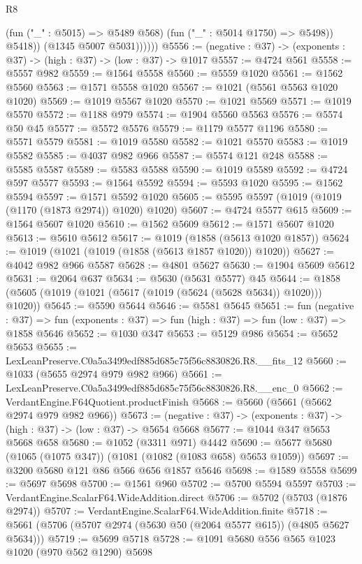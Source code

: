 \begin{lexlean}{R8}
\begin{coremodule}
                    (fun ("_" : @5015) => @5489 @568)
                    (fun ("_" : @5014 @1750) => @5498))
                  @5418))
              (@1345 @5007 @5031))))))
@5556 := (negative : @37) -> (exponents : @37) -> (high : @37) -> (low : @37) -> @1017
@5557 := @4724 @561
@5558 := @5557 @982
@5559 := @1564 @5558
@5560 := @5559 @1020
@5561 := @1562 @5560
@5563 := @1571 @5558 @1020
@5567 := @1021 (@5561 @5563 @1020 @1020)
@5569 := @1019 @5567 @1020
@5570 := @1021 @5569
@5571 := @1019 @5570
@5572 := @1188 @979
@5574 := @1904 @5560 @5563
@5576 := @5574 @50 @45
@5577 := @5572 @5576
@5579 := @1179 @5577 @1196
@5580 := @5571 @5579
@5581 := @1019 @5580
@5582 := @1021 @5570
@5583 := @1019 @5582
@5585 := @4037 @982 @966
@5587 := @5574 @121 @248
@5588 := @5585 @5587
@5589 := @5583 @5588
@5590 := @1019 @5589
@5592 := @4724 @597 @5577
@5593 := @1564 @5592
@5594 := @5593 @1020
@5595 := @1562 @5594
@5597 := @1571 @5592 @1020
@5605 := @5595 @5597 (@1019 (@1019 (@1170 (@1873 @2974)) @1020) @1020)
@5607 := @4724 @5577 @615
@5609 := @1564 @5607 @1020
@5610 := @1562 @5609
@5612 := @1571 @5607 @1020
@5613 := @5610 @5612
@5617 := @1019 (@1858 (@5613 @1020 @1857))
@5624 := @1019 (@1021 (@1019 (@1858 (@5613 @1857 @1020)) @1020))
@5627 := @4042 @982 @966 @5587
@5628 := @4801 @5627
@5630 := @1904 @5609 @5612
@5631 := @2064 @637
@5634 := @5630 (@5631 @5577) @45
@5644 := @1858 (@5605 (@1019 (@1021 (@5617 (@1019 (@5624 (@5628 @5634)) @1020))) @1020))
@5645 := @5590 @5644
@5646 := @5581 @5645
@5651 := fun (negative : @37) =>
  fun (exponents : @37) => fun (high : @37) => fun (low : @37) => @1858 @5646
@5652 := @1030 @347
@5653 := @5129 @986
@5654 := @5652 @5653
@5655 := LexLeanPreserve.C0a5a3499edf885d685c75f56c8830826.R8.__fits_12
@5660 := @1033 (@5655 @2974 @979 @982 @966)
@5661 := LexLeanPreserve.C0a5a3499edf885d685c75f56c8830826.R8.__enc_0
@5662 := VerdantEngine.F64Quotient.productFinish
@5668 := @5660 (@5661 (@5662 @2974 @979 @982 @966))
@5673 := (negative : @37) -> (exponents : @37) -> (high : @37) -> (low : @37) -> @5654 @5668
@5677 := @1044 @347 @5653 @5668 @658
@5680 := @1052 (@3311 @971) @4442
@5690 := @5677 @5680 (@1065 (@1075 @347)) (@1081 (@1082 (@1083 @658) @5653 @1059))
@5697 := @3200 @5680 @121 @86 @566 @656 @1857 @5646
@5698 := @1589 @5558
@5699 := @5697 @5698
@5700 := @1561 @960
@5702 := @5700 @5594 @5597
@5703 := VerdantEngine.ScalarF64.WideAddition.direct
@5706 := @5702 (@5703 (@1876 @2974))
@5707 := VerdantEngine.ScalarF64.WideAddition.finite
@5718 := @5661 (@5706 (@5707 @2974 (@5630 @50 (@2064 @5577 @615)) (@4805 @5627 @5634)))
@5719 := @5699 @5718
@5728 := @1091 @5680 @556 @565 @1023 @1020 (@970 @562 @1290) @5698

\end{coremodule}
\end{lexlean}
